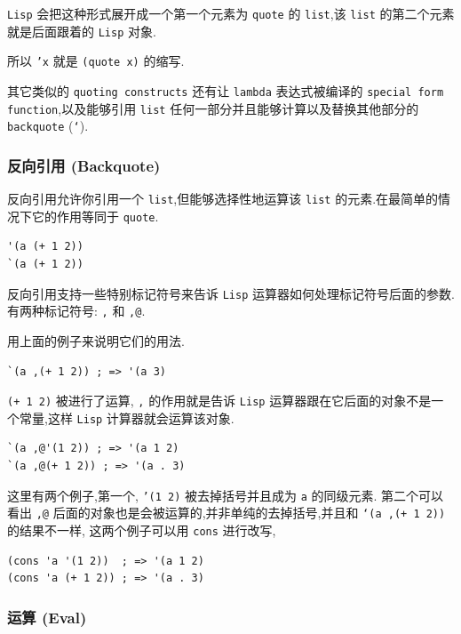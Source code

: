 \documentclass[11pt]{article}
\begin{document}
\texttt{Lisp} 会把这种形式展开成一个第一个元素为 \texttt{quote} 的 \texttt{list},该 \texttt{list} 的第二个元素就是后面跟着的 \texttt{Lisp} 对象.

所以 \texttt{'x} 就是 \texttt{(quote x)} 的缩写.

其它类似的 \texttt{quoting constructs} 还有让 \texttt{lambda} 表达式被编译的 \texttt{special form} \texttt{function},以及能够引用 \texttt{list} 任何一部分并且能够计算以及替换其他部分的 \texttt{backquote} (\texttt{`}).


\subsubsection{反向引用 (Backquote)}
\label{sec:org3cd5560}

反向引用允许你引用一个 \texttt{list},但能够选择性地运算该 \texttt{list} 的元素.在最简单的情况下它的作用等同于 \texttt{quote}.

\begin{verbatim}
'(a (+ 1 2))
`(a (+ 1 2))
\end{verbatim}

反向引用支持一些特别标记符号来告诉 \texttt{Lisp} 运算器如何处理标记符号后面的参数.有两种标记符号: \texttt{,} 和 \texttt{,@}.

用上面的例子来说明它们的用法.

\begin{verbatim}
`(a ,(+ 1 2)) ; => '(a 3)
\end{verbatim}

\texttt{(+ 1 2)} 被进行了运算, \texttt{,} 的作用就是告诉 \texttt{Lisp} 运算器跟在它后面的对象不是一个常量,这样 \texttt{Lisp} 计算器就会运算该对象.

\begin{verbatim}
`(a ,@'(1 2)) ; => '(a 1 2)
`(a ,@(+ 1 2)) ; => '(a . 3)
\end{verbatim}

这里有两个例子,第一个, \texttt{'(1 2)} 被去掉括号并且成为 \texttt{a} 的同级元素.
第二个可以看出 \texttt{,@} 后面的对象也是会被运算的,并非单纯的去掉括号,并且和 \texttt{`(a ,(+ 1 2))} 的结果不一样,
这两个例子可以用 \texttt{cons} 进行改写,

\begin{verbatim}
(cons 'a '(1 2))  ; => '(a 1 2)
(cons 'a (+ 1 2)) ; => '(a . 3)
\end{verbatim}



\subsubsection{运算 (Eval)}
\label{sec:orgf192f77}
\end{document}
